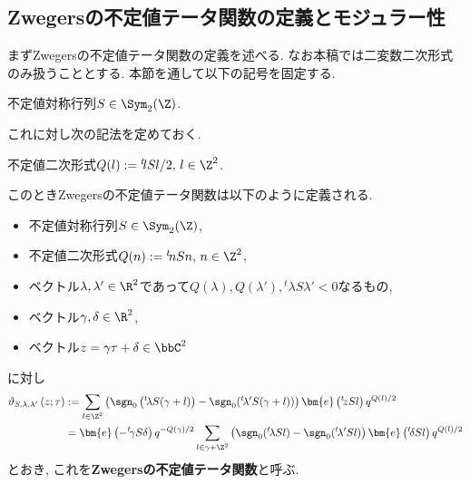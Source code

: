 \documentclass[11pt,b5paper,oneside,lualatex]{ltjsarticle} %
\numberwithin{equation}{section} %
\begin{document}
\subsection{Zwegersの不定値テータ関数の定義とモジュラー性} \label{subsec:Zwegers_theta_def}



まずZwegersの不定値テータ関数の定義を述べる. 
なお本稿では二変数二次形式のみ扱うこととする. 
本節を通して以下の記号を固定する. 

\begin{symb}
	不定値対称行列$ S \in \Sym_2(\Z) $.
\end{symb}

これに対し次の記法を定めておく. 

\begin{dfn}
	不定値二次形式$ Q(l) := {}^t\!l S l /2, \, l \in \Z^2 $.
\end{dfn}

このときZwegersの不定値テータ関数は以下のように定義される. 

\begin{dfn}
	\label{dfn:Zwegers_theta}
	\leavevmode %
	\begin{itemize}
		\item 不定値対称行列$ S \in \Sym_2(\Z) $,
		\item 不定値二次形式$ Q(n) := {}^t\!n S n, \, n \in \Z^2 $,
		\item ベクトル$ \lambda, \lambda' \in \R^2 $であって$ Q(\lambda), Q(\lambda'), {}^t\!\lambda S \lambda' < 0 $なるもの,
		\item ベクトル$ \gamma, \delta \in \R^2 $,
		\item ベクトル$ z = \gamma \tau + \delta \in \bbC^2 $
	\end{itemize}
	に対し
	\begin{align}
		\vartheta_{S, \lambda, \lambda'} \left( z; \tau \right)
		&:=
		\sum_{l \in \Z^2}
		\left(\sgn_0 \left( {}^t\!\lambda S (\gamma + l) \right) - \sgn_0( {}^t\!\lambda' S (\gamma + l) ) \right)
		\bm{e} \left( {}^t\!z S l \right) q^{Q(l)/2}
		\\
		&=
		\bm{e} \left( -{}^t\!\gamma S \delta \right) q^{-Q(\gamma)/2}		
		\sum_{l \in \gamma + \Z^2}
		\left(\sgn_0( {}^t\!\lambda S l ) - \sgn_0( {}^t\!\lambda' S l ) \right)
		\bm{e} \left( {}^t\!\delta S l \right) q^{Q(l)/2}
	\end{align}
	とおき, これを\textbf{Zwegersの不定値テータ関数}と呼ぶ. 
\end{dfn}
\end{document}
